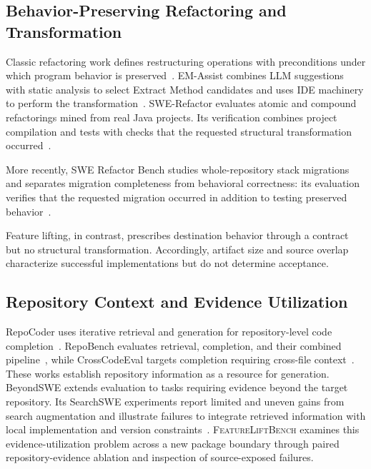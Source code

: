 \documentclass[acmsmall,screen,review,anonymous]{acmart}
\newcommand{\flb}{\textsc{FeatureLiftBench}\xspace}
\begin{document}
\subsection{Behavior-Preserving Refactoring and Transformation}

Classic refactoring work defines restructuring operations with preconditions
under which program behavior is preserved~\cite{opdyke1992refactoring}.
EM-Assist combines LLM suggestions with static analysis to
select Extract Method candidates and uses IDE machinery to perform the
transformation~\cite{pomian2024emassist}. SWE-Refactor evaluates atomic and
compound refactorings mined from real Java projects. Its verification combines
project compilation and tests with checks that the requested structural
transformation occurred~\cite{xu2026swerefactor}.

More recently, SWE Refactor Bench studies whole-repository stack migrations and
separates migration completeness from behavioral correctness: its evaluation
verifies that the requested migration occurred in addition to testing preserved
behavior~\cite{hong2026swerefactorbench}.

Feature lifting, in contrast, prescribes destination behavior through a contract
but no structural transformation. Accordingly, artifact size and source overlap
characterize successful implementations but do not determine acceptance.

\subsection{Repository Context and Evidence Utilization}

RepoCoder uses iterative retrieval and generation for repository-level code
completion~\cite{zhang2023repocoder}. RepoBench evaluates retrieval, completion,
and their combined pipeline~\cite{liu2024repobench}, while CrossCodeEval targets
completion requiring cross-file context~\cite{ding2023crosscodeeval}. These works
establish repository information as a resource for generation.
BeyondSWE extends evaluation to tasks requiring evidence beyond the target
repository. Its SearchSWE experiments report limited and uneven gains from search
augmentation and illustrate failures to integrate retrieved information with
local implementation and version constraints~\cite{chen2026beyondswe}.
\flb examines this evidence-utilization problem across a new package boundary
through paired repository-evidence ablation and inspection of
source-exposed failures.
\end{document}
